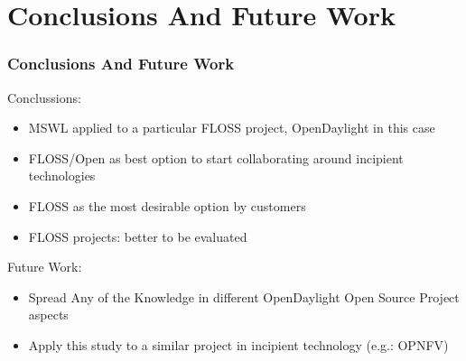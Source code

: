 \section{Conclusions And Future Work}

\begin{frame}
\frametitle{Conclusions And Future Work}

Conclussions:
\begin{itemize}
 \item MSWL applied to a particular FLOSS project, OpenDaylight in this case
 \item FLOSS/Open as best option to start collaborating around incipient technologies
 \item FLOSS as the most desirable option by customers
 \item FLOSS projects: better to be evaluated
\end{itemize}

Future Work:
\begin{itemize}
 \item Spread Any of the Knowledge in different OpenDaylight Open Source Project aspects
 \item Apply this study to a similar project in incipient technology (e.g.: OPNFV)
\end{itemize}

\end{frame}
